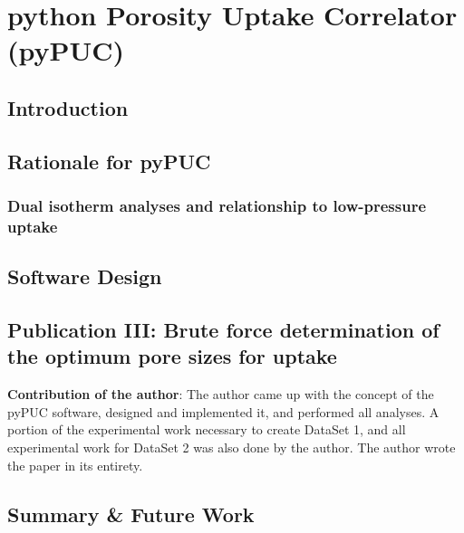 \chapter{python Porosity Uptake Correlator (pyPUC)}
\label{ch:pyPUC}

\section{Introduction}

\section{Rationale for pyPUC}
\subsection{\texorpdfstring{Dual isotherm analyses and relationship to low-pressure  uptake}{Dual isotherm analyses and relationship to low-pressure CO2 uptake}}

\section{Software Design}

\newpage
\section[Publication III]{\texorpdfstring{Publication III: Brute force determination of the optimum pore sizes for
 uptake}{Publication III: Brute force determination of the optimum pore sizes for
CO2 uptake}}

\textbf{Contribution of the author}: The author came up with the concept of the pyPUC software, designed and implemented it, and performed all analyses. A portion of the experimental work necessary to create DataSet 1, and all experimental work for DataSet 2 was also done by the author. The author wrote the paper in its entirety.

\newpage

\setlength{\originalVOffset}{\voffset}   
\setlength{\originalHOffset}{\hoffset}

\setlength{\voffset}{0cm}
\setlength{\hoffset}{0cm}

\setlength{\voffset}{\originalVOffset}
\setlength{\hoffset}{\originalHOffset}

\section{Summary \& Future Work}

